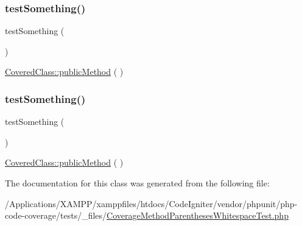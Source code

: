 \subsubsection{\texorpdfstring{test\+Something()}{testSomething()}\hspace{0.1cm}{\footnotesize\ttfamily [1/2]}}
{\footnotesize\ttfamily test\+Something (\begin{DoxyParamCaption}{ }\end{DoxyParamCaption})}

\mbox{\hyperlink{class_covered_class_ab07dfd901b43d1dcdbc2d116d7f5a566}{Covered\+Class\+::public\+Method}} ( ) \mbox{\label{class_coverage_method_parentheses_whitespace_test_a0fc4e17369bc9607ebdd850d9eda8167}} 
\subsubsection{\texorpdfstring{test\+Something()}{testSomething()}\hspace{0.1cm}{\footnotesize\ttfamily [2/2]}}
{\footnotesize\ttfamily test\+Something (\begin{DoxyParamCaption}{ }\end{DoxyParamCaption})}

\mbox{\hyperlink{class_covered_class_ab07dfd901b43d1dcdbc2d116d7f5a566}{Covered\+Class\+::public\+Method}} ( ) 

The documentation for this class was generated from the following file\+:\begin{DoxyCompactItemize}
\item 
/\+Applications/\+X\+A\+M\+P\+P/xamppfiles/htdocs/\+Code\+Igniter/vendor/phpunit/php-\/code-\/coverage/tests/\+\_\+files/\mbox{\hyperlink{php-code-coverage_2tests_2__files_2_coverage_method_parentheses_whitespace_test_8php}{Coverage\+Method\+Parentheses\+Whitespace\+Test.\+php}}\end{DoxyCompactItemize}
